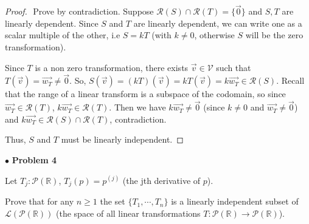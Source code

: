 \documentclass{article}
\begin{document}
\begin{proof}
$ $\newline
Prove by contradiction. Suppose $\mathcal{R}(S) \cap \mathcal{R}(T) = \{ \vec{0} \}$ and $S,T$ are linearly dependent. Since $S$ and $T$ are linearly dependent, we can write one as a scalar multiple of the other, i.e $S=kT$ (with $k \ne 0$, otherwise $S$ will be the zero transformation).

Since $T$ is a non zero transformation, there exists $\vec{v} \in \mathcal{V}$ such that $T(\vec{v})=\vec{w_T} \ne \vec{0}$. So, $S(\vec{v}) = (kT)(\vec{v}) = kT(\vec{v}) = k\vec{w_T} \in \mathcal{R}(S)$. Recall that the range of a linear transform is a subspace of the codomain, so since $\vec{w_T} \in \mathcal{R}(T)$,  $k \vec{w_T} \in \mathcal{R}(T)$. Then we have $k \vec{w_T} \ne \vec{0}$ (since $k \ne 0$ and $\vec{w_T} \ne \vec{0}$) and $k \vec{w_T} \in \mathcal{R}(S) \cap \mathcal{R}(T)$, contradiction.

Thus, $S$ and $T$ must be linearly independent. 
\end{proof}

\newpage
$ \bullet$ \textbf{Problem 4} 
\medskip

\begin{itshape}
Let $T_j: \mathcal{P}(\mathbb{R})$, $T_j(p)=p^{(j)}$ (the jth derivative of $p$).

Prove that for any $n \ge 1$ the set $\{T_1, \cdots , T_n \}$ is a linearly independent subset of $\mathcal{L}(\mathcal{P}(\mathbb{R}))$ (the space of all linear transformations $T: \mathcal{P}(\mathbb{R}) \to \mathcal{P}(\mathbb{R})$). 
\end{itshape}
\medskip
\end{document}
